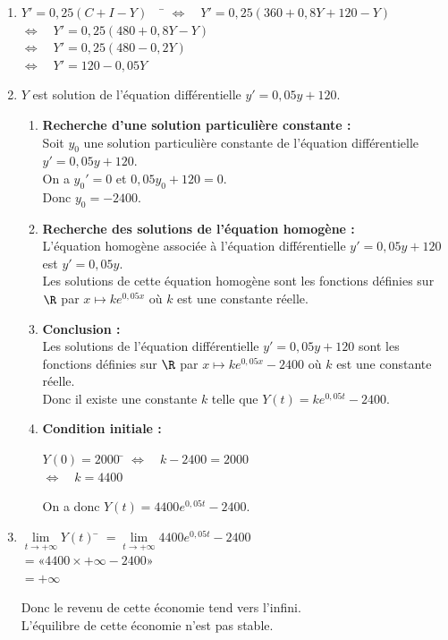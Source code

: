 \documentclass[a4paper,11pt,exos]{nsi} %
\begin{document}
\textcolor{UGLiBlue}{
    \begin{enumerate} 
        \item \begin{tabbing}
            $Y'=0,25(C+I-Y) \quad$ \= $\iff \quad Y'=0,25(360+0,8Y+120-Y)$\\
        \> $\iff \quad Y'=0,25(480+0,8Y-Y)$\\
        \> $\iff \quad Y'=0,25(480-0,2Y)$\\
        \> $\iff \quad Y'=120-0,05Y$
    \end{tabbing}
        \item $Y$ est solution de l'équation différentielle $y'=0,05y+120$.\\
        \begin{enumerate}
            \item \textbf{Recherche d'une solution particulière constante :}\\
            Soit $y_0$ une solution particulière constante de l'équation différentielle $y'=0,05y+120$.\\
            On a $y_0'=0$ et $0,05y_0+120=0$.\\
            Donc $y_0=-2400$.
            \item \textbf{Recherche des solutions de l'équation homogène :}\\
            L'équation homogène associée à l'équation différentielle $y'=0,05y+120$ est $y'=0,05y$.\\
            Les solutions de cette équation homogène sont les fonctions définies sur $\R$ par $x\mapsto ke^{0,05x}$ où $k$ est une constante réelle.
            \item \textbf{Conclusion :}\\
            Les solutions de l'équation différentielle $y'=0,05y+120$ sont les fonctions définies sur $\R$ par $x\mapsto ke^{0,05x}-2400$ où $k$ est une constante réelle.\\
            Donc il existe une constante $k$ telle que $Y(t)=ke^{0,05t}-2400$.\\
            \item \textbf{Condition initiale :}
            \begin{tabbing}
                $Y(0)=2000$ \= $\iff \quad k-2400=2000$\\
                \> $\iff \quad k=4400$
            \end{tabbing}
            On a donc $Y(t)=4400e^{0,05t}-2400$.
        \end{enumerate}
        \item \begin{tabbing}
            $\lim\limits_{t\to +\infty}Y(t)$ \= $=\lim\limits_{t\to +\infty}4400e^{0,05t}-2400$\\
            \> $=« 4400\times +\infty-2400 »$\\
            \> $=+\infty$
        \end{tabbing}
        Donc le revenu de cette économie tend vers l'infini.\\
        L'équilibre de cette économie n'est pas stable.
    \end{enumerate}
}
\end{document}
